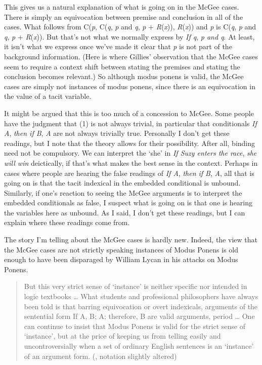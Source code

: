 \documentclass[
  11pt,
  letterpaper,
  DIV=11,
  numbers=noendperiod,
  twoside]{scrartcl}
\begin{document}
This gives us a natural explanation of what is going on in the McGee
cases. There is simply an equivocation between premise and conclusion in
all of the cases. What follows from C(\emph{p}, C(\emph{q}, \emph{p} and
\emph{q}, \emph{p} + \emph{R}(\emph{x})), \emph{R}(\emph{x})) and
\emph{p} is C(\emph{q}, \emph{p} and \emph{q}, \emph{p} +
\emph{R}(\emph{x})). But that's not what we normally express by \emph{If
q}, \emph{p and q}. At least, it isn't what we express once we've made
it clear that \emph{p} is not part of the background information. (Here
is where Gillies' observation that the McGee cases seem to require a
context shift between stating the premises and stating the conclusion
becomes relevant.) So although modus ponens is valid, the McGee cases
are simply not instances of modus ponens, since there is an equivocation
in the value of a tacit variable.

It might be argued that this is too much of a concession to McGee. Some
people have the judgment that (1) is not always trivial, in particular
that conditionals \emph{If A}, \emph{then if B}, \emph{A} are not always
trivially true. Personally I don't get these readings, but I note that
the theory allows for their possibility. After all, binding need not be
compulsory. We can interpret the `she' in \emph{If Suzy enters the
race}, \emph{she will win} deictically, if that's what makes the best
sense in the context. Perhaps in cases where people are hearing the
false readings of \emph{If A}, \emph{then if B}, \emph{A}, all that is
going on is that the tacit indexical in the embedded conditional is
unbound. Similarly, if one's reaction to seeing the McGee arguments is
to interpret the embedded conditionals as false, I suspect what is going
on is that one is hearing the variables here as unbound. As I said, I
don't get these readings, but I can explain where these readings come
from.

The story I'm telling about the McGee cases is hardly new. Indeed, the
view that the McGee cases are not strictly speaking instances of Modus
Ponens is old enough to have been disparaged by William Lycan in his
attacks on Modus Ponens.

\begin{quote}
But this very strict sense of `instance' is neither specific nor
intended in logic textbooks \ldots{} What students and professional
philosophers have always been told is that barring equivocation or overt
indexicals, arguments of the sentential form If A, B; A; therefore, B
are valid arguments, period \ldots{} One can continue to insist that
Modus Ponens is valid for the strict sense of `instance', but at the
price of keeping us from telling easily and uncontroversially when a set
of ordinary English sentences is an `instance' of an argument form.
(, notation slightly altered)
\end{quote}
\end{document}
